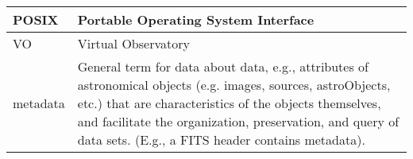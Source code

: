 \begin{longtable}{|l|p{}|}
POSIX & Portable Operating System Interface \\\hline
VO & Virtual Observatory \\\hline
metadata & General term for data about data, e.g., attributes of astronomical objects (e.g. images, sources, astroObjects, etc.) that are characteristics of the objects themselves, and facilitate the organization, preservation, and query of data sets. (E.g., a FITS header contains metadata). \\\hline
\end{longtable}
